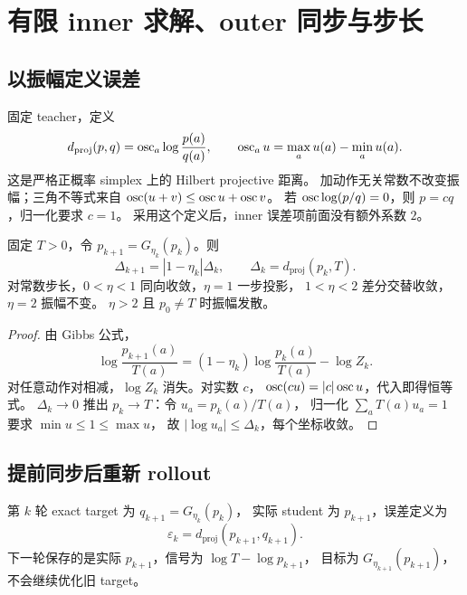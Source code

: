\chapter{有限 inner 求解、outer 同步与步长}
\label{chap:outer}

\section{以振幅定义误差}
固定 teacher，定义
\[
 d_{\mathrm{proj}}(p,q)=\operatorname{osc}_a\log\frac{p(a)}{q(a)},\qquad
 \operatorname{osc}_a u=\max_a u(a)-\min_a u(a).
\]
这是严格正概率 simplex 上的 Hilbert projective 距离。
加动作无关常数不改变振幅；三角不等式来自
$\operatorname{osc}(u+v)\le\operatorname{osc} u+\operatorname{osc} v$。
若 $\operatorname{osc}\log(p/q)=0$，则 $p=cq$，归一化要求 $c=1$。
采用这个定义后，inner 误差项前面没有额外系数 $2$。

\begin{theorem}\label{thm:projective}
固定 $T>0$，令 $p_{k+1}=G_{\eta_k}(p_k)$。则
\[
 \Delta_{k+1}=|1-\eta_k|\Delta_k,\qquad
 \Delta_k=d_{\mathrm{proj}}(p_k,T).
\]
对常数步长，$0<\eta<1$ 同向收敛，$\eta=1$ 一步投影，
$1<\eta<2$ 差分交替收敛，$\eta=2$ 振幅不变。
$\eta>2$ 且 $p_0\ne T$ 时振幅发散。
\end{theorem}
\begin{proof}
由 Gibbs 公式，
\[
 \log\frac{p_{k+1}(a)}{T(a)}
 =(1-\eta_k)\log\frac{p_k(a)}{T(a)}-\log Z_k.
\]
对任意动作对相减，$\log Z_k$ 消失。对实数 $c$，
$\operatorname{osc}(cu)=|c|\operatorname{osc} u$，代入即得恒等式。
$\Delta_k\to0$ 推出 $p_k\to T$：令 $u_a=p_k(a)/T(a)$，
归一化 $\sum_a T(a)u_a=1$ 要求 $\min u\le1\le\max u$，
故 $|\log u_a|\le\Delta_k$，每个坐标收敛。
\end{proof}

\section{提前同步后重新 rollout}
第 $k$ 轮 exact target 为 $q_{k+1}=G_{\eta_k}(p_k)$，
实际 student 为 $p_{k+1}$，误差定义为
\[
 \varepsilon_k=d_{\mathrm{proj}}(p_{k+1},q_{k+1}).
\]
下一轮保存的是实际 $p_{k+1}$，信号为 $\log T-\log p_{k+1}$，
目标为 $G_{\eta_{k+1}}(p_{k+1})$，不会继续优化旧 target。

